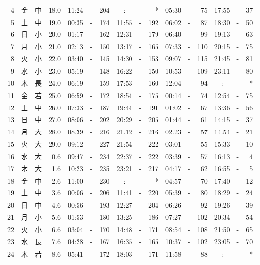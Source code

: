 \documentclass[12pt.a4j]{jsarticle}
\begin{document}
\begin{center}
\begin{table}[ht]
\begin{tabular}{|rc|cr|ccrccr|ccrccr|}
 4 & 金 & 中 & 18.0 & 11:24 &-& 204 & --:-- & &  *  & 05:30 &-&  75 & 17:55 &-&  37 \\
 5 & 土 & 中 & 19.0 & 00:35 &-& 174 & 11:55 &-& 192 & 06:02 &-&  87 & 18:30 &-&  50 \\
 6 & 日 & 小 & 20.0 & 01:17 &-& 162 & 12:31 &-& 179 & 06:40 &-&  99 & 19:13 &-&  63 \\
 7 & 月 & 小 & 21.0 & 02:13 &-& 150 & 13:17 &-& 165 & 07:33 &-& 110 & 20:15 &-&  75 \\
 8 & 火 & 小 & 22.0 & 03:40 &-& 145 & 14:30 &-& 153 & 09:07 &-& 115 & 21:45 &-&  81 \\
 9 & 水 & 小 & 23.0 & 05:19 &-& 148 & 16:22 &-& 150 & 10:53 &-& 109 & 23:11 &-&  80 \\
10 & 木 & 長 & 24.0 & 06:19 &-& 159 & 17:53 &-& 160 & 12:04 &-&  94 & --:-- & &  *  \\
11 & 金 & 若 & 25.0 & 06:59 &-& 172 & 18:54 &-& 175 & 00:14 &-&  74 & 12:54 &-&  75 \\
12 & 土 & 中 & 26.0 & 07:33 &-& 187 & 19:44 &-& 191 & 01:02 &-&  67 & 13:36 &-&  56 \\
13 & 日 & 中 & 27.0 & 08:06 &-& 202 & 20:29 &-& 205 & 01:44 &-&  61 & 14:15 &-&  37 \\
14 & 月 & 大 & 28.0 & 08:39 &-& 216 & 21:12 &-& 216 & 02:23 &-&  57 & 14:54 &-&  21 \\
15 & 火 & 大 & 29.0 & 09:12 &-& 227 & 21:54 &-& 222 & 03:01 &-&  55 & 15:33 &-&  10 \\
16 & 水 & 大 &  0.6 & 09:47 &-& 234 & 22:37 &-& 222 & 03:39 &-&  57 & 16:13 &-&   4 \\
17 & 木 & 大 &  1.6 & 10:23 &-& 235 & 23:21 &-& 217 & 04:17 &-&  62 & 16:55 &-&   5 \\
18 & 金 & 中 &  2.6 & 11:00 &-& 230 & --:-- & &  *  & 04:57 &-&  70 & 17:40 &-&  12 \\
19 & 土 & 中 &  3.6 & 00:06 &-& 206 & 11:41 &-& 220 & 05:39 &-&  80 & 18:29 &-&  24 \\
20 & 日 & 中 &  4.6 & 00:56 &-& 193 & 12:27 &-& 204 & 06:26 &-&  92 & 19:26 &-&  39 \\
21 & 月 & 小 &  5.6 & 01:53 &-& 180 & 13:25 &-& 186 & 07:27 &-& 102 & 20:34 &-&  54 \\
22 & 火 & 小 &  6.6 & 03:04 &-& 170 & 14:48 &-& 171 & 08:54 &-& 108 & 21:50 &-&  65 \\
23 & 水 & 長 &  7.6 & 04:28 &-& 167 & 16:35 &-& 165 & 10:37 &-& 102 & 23:05 &-&  70 \\
24 & 木 & 若 &  8.6 & 05:41 &-& 172 & 18:03 &-& 171 & 11:58 &-&  88 & --:-- & &  *  \\

\end{tabular}
\end{table}
\end{center}
\end{document}
